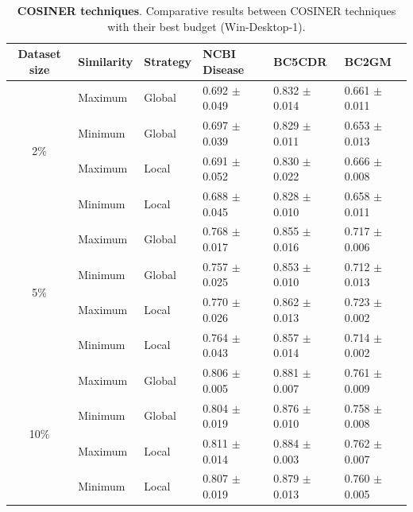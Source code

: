 
    \begin{table}
    \footnotesize
    \centering
    \caption{\textbf{COSINER techniques}. Comparative results between COSINER techniques with their best budget (Win-Desktop-1).}
    \begin{tabular}{@{}cp{}p{}lll@{}}
    \toprule
    \textbf{Dataset size} & \textbf{Similarity} & \textbf{Strategy} &
    \textbf{NCBI Disease} & \textbf{BC5CDR} & \textbf{BC2GM} \\ \midrule
    \multirow{4}{*}{2\%} & Maximum & Global & 0.692 $\pm$ 0.049 & 0.832 $\pm$ 0.014 & 0.661 $\pm$ 0.011 \\
 & Minimum & Global & 0.697 $\pm$ 0.039 & 0.829 $\pm$ 0.011 & 0.653 $\pm$ 0.013 \\
 & Maximum & Local & 0.691 $\pm$ 0.052 & 0.830 $\pm$ 0.022 & 0.666 $\pm$ 0.008 \\
 & Minimum & Local & 0.688 $\pm$ 0.045 & 0.828 $\pm$ 0.010 & 0.658 $\pm$ 0.011 \\
\midrule
\multirow{4}{*}{5\%} & Maximum & Global & 0.768 $\pm$ 0.017 & 0.855 $\pm$ 0.016 & 0.717 $\pm$ 0.006 \\
 & Minimum & Global & 0.757 $\pm$ 0.025 & 0.853 $\pm$ 0.010 & 0.712 $\pm$ 0.013 \\
 & Maximum & Local & 0.770 $\pm$ 0.026 & 0.862 $\pm$ 0.013 & 0.723 $\pm$ 0.002 \\
 & Minimum & Local & 0.764 $\pm$ 0.043 & 0.857 $\pm$ 0.014 & 0.714 $\pm$ 0.002 \\
\midrule
\multirow{4}{*}{10\%} & Maximum & Global & 0.806 $\pm$ 0.005 & 0.881 $\pm$ 0.007 & 0.761 $\pm$ 0.009 \\
 & Minimum & Global & 0.804 $\pm$ 0.019 & 0.876 $\pm$ 0.010 & 0.758 $\pm$ 0.008 \\
 & Maximum & Local & 0.811 $\pm$ 0.014 & 0.884 $\pm$ 0.003 & 0.762 $\pm$ 0.007 \\
 & Minimum & Local & 0.807 $\pm$ 0.019 & 0.879 $\pm$ 0.013 & 0.760 $\pm$ 0.005 \\
    \bottomrule
    \end{tabular}
    \label{tab:methods_comp}
    \end{table}
    